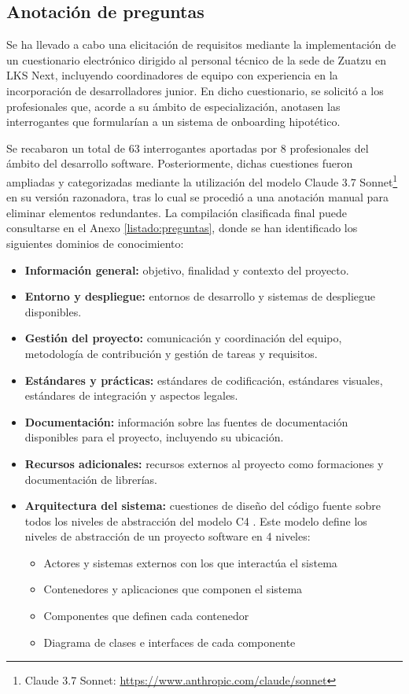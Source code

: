 \subsection{Anotación de preguntas}
Se ha llevado a cabo una elicitación de requisitos mediante la implementación de un cuestionario electrónico dirigido al personal técnico de la sede de Zuatzu en LKS Next, incluyendo coordinadores de equipo con experiencia en la incorporación de desarrolladores junior. En dicho cuestionario, se solicitó a los profesionales que, acorde a su ámbito de especialización, anotasen las interrogantes que formularían a un sistema de onboarding hipotético.

Se recabaron un total de 63 interrogantes aportadas por 8 profesionales del ámbito del desarrollo software. Posteriormente, dichas cuestiones fueron ampliadas y categorizadas mediante la utilización del modelo Claude 3.7 Sonnet\footnote{Claude 3.7 Sonnet: \url{https://www.anthropic.com/claude/sonnet}} en su versión razonadora, tras lo cual se procedió a una anotación manual para eliminar elementos redundantes. La compilación clasificada final puede consultarse en el Anexo \ref{listado:preguntas}, donde se han identificado los siguientes dominios de conocimiento:

\begin{itemize}
\item\textbf{Información general: }objetivo, finalidad y contexto del proyecto.
\item\textbf{Entorno y despliegue: }entornos de desarrollo y sistemas de despliegue disponibles.
\item\textbf{Gestión del proyecto: }comunicación y coordinación del equipo, metodología de contribución y gestión de tareas y requisitos.
\item\textbf{Estándares y prácticas: }estándares de codificación, estándares visuales, estándares de integración y aspectos legales.
\item\textbf{Documentación: }información sobre las fuentes de documentación disponibles para el proyecto, incluyendo su ubicación.
\item\textbf{Recursos adicionales: }recursos externos al proyecto como formaciones y documentación de librerías.
\item\textbf{Arquitectura del sistema: }cuestiones de diseño del código fuente sobre todos los niveles de abstracción del modelo C4 \cite{brown_c4_2018}. Este modelo define los niveles de abstracción de un proyecto software en 4 niveles:
\begin{itemize}
\item Actores y sistemas externos con los que interactúa el sistema
\item Contenedores y aplicaciones que componen el sistema
\item Componentes que definen cada contenedor
\item Diagrama de clases e interfaces de cada componente
\end{itemize}
\end{itemize}

